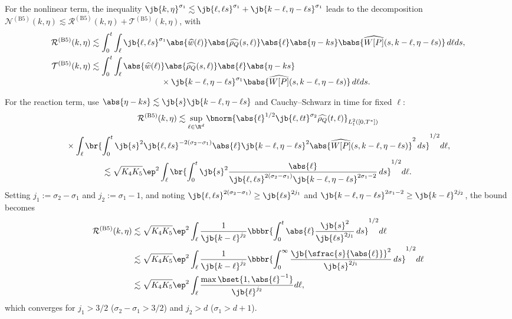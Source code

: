 For the nonlinear term, the inequality $\jb{k,\eta}^{\sigma_1} \lesssim \jb{\ell,\ell s}^{\sigma_1} + \jb{k-\ell,\eta-\ell s}^{\sigma_1}$ leads to the decomposition $\mathcal{N}^{\mathrm{(B5)}}(k,\eta)\lesssim \mathcal{R}^{\mathrm{(B5)}}(k,\eta)+ \mathcal{T}^{\mathrm{(B5)}}(k,\eta)$, with
\begin{align*}
\mathcal{R}^{\mathrm{(B5)}}(k,\eta)&\lesssim\int_0^t\int_\ell \jb{\ell,\ell s}^{\sigma_1}\abs{\widehat{w}(\ell )}\abs{\widehat{\rho_Q}(s,\ell )}\abs{\ell}\abs{\eta-ks}\babs{\widehat{W[P]}(s,k-\ell ,\eta-\ell s)}\,d\ell ds,\\
\mathcal{T}^{\mathrm{(B5)}}(k,\eta)&\lesssim\int_0^t\int_\ell \abs{\widehat{w}(\ell )}\abs{\widehat{\rho_Q}(s,\ell )}\abs{\ell}\abs{\eta-ks}\\[-5pt]
&\hspace{3cm}\times\jb{k-\ell,\eta-\ell s}^{\sigma_1}\babs{\widehat{W[P]}(s,k-\ell ,\eta-\ell s)}\,d\ell ds.
\end{align*}

For the reaction term, use $\abs{\eta-ks} \lesssim \jb{s} \jb{k-\ell,\eta-\ell s}$ and Cauchy–Schwarz in time for fixed $\ell$:
\begin{multline*}
\mathcal{R}^{\mathrm{(B5)}}(k,\eta)\lesssim\sup_{\ell\in\R^d}\bnorm{\abs{\ell}^{1/2}\jb{\ell,\ell t}^{\sigma_2}\widehat{\rho_Q}(t,\ell)}_{L^2_t([0,T^*])}\\
{}\times\int_\ell\br{\int_0^t\jb{s}^2 \jb{\ell,\ell s}^{-2(\sigma_2-\sigma_1)}\abs{\ell}\jb{k-\ell,\eta-\ell s}^2\abs{\widehat{W[P]}(s,k-\ell ,\eta-\ell s)}^2\,ds}^{1/2} d\ell,\\
\lesssim\sqrt{K_4K_5}\ep^2\int_\ell\br{\int_0^t\jb{s}^2\frac{\abs{\ell}}{\jb{\ell,\ell s}^{2(\sigma_2-\sigma_1)}\jb{k-\ell,\eta-\ell s}^{2\sigma_1-2}}\,ds}^{1/2} d\ell.
\end{multline*}
Setting $j_1:=\sigma_2-\sigma_1$ and $j_2:=\sigma_1-1$, and noting $\jb{\ell,\ell s}^{2(\sigma_2-\sigma_1)}\geq \jb{\ell s}^{2j_1}$ and $\jb{k-\ell,\eta-\ell s}^{2\sigma_1-2}\geq \jb{k-\ell}^{2j_2}$, the bound becomes
\begin{align*}\mathcal{R}^{\mathrm{(B5)}}(k,\eta)&\lesssim\sqrt{K_4K_5}\ep^2\int_\ell\frac{1}{\jb{k-\ell}^{j_2}}\bbbr{\int_0^t\abs{\ell}\frac{\jb{s}^2}{\jb{\ell s}^{2j_1}}\,ds}^{1/2} d\ell\\
&\lesssim\sqrt{K_4K_5}\ep^2\int_\ell\frac{1}{\jb{k-\ell}^{j_2}}\bbbr{\int_0^\infty\frac{\jb{\sfrac{s}{\abs{\ell}}}^2}{\jb{s}^{2j_1}}\,ds}^{1/2} d\ell\\
&\lesssim\sqrt{K_4K_5}\ep^2\int_\ell\frac{\max\bset{1,\abs{\ell}^{-1}}}{\jb{\ell}^{j_2}} d\ell,
\end{align*}which converges for $j_1>3/2$ (\ie $\sigma_2-\sigma_1>3/2$) and $j_2>d$ (\ie $\sigma_1>d+1$).

